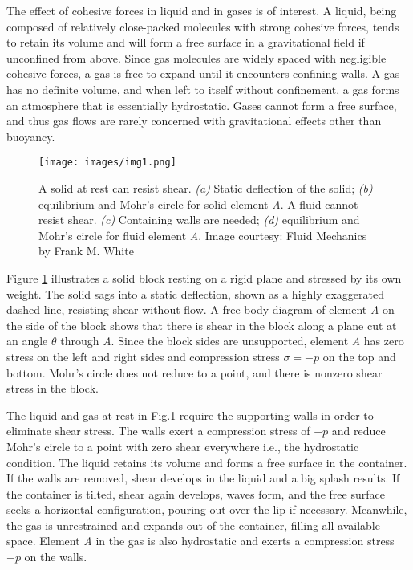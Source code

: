 \documentclass[12pt,twoside]{report}
\begin{document}
The effect of cohesive forces in liquid and in gases is of interest. A liquid, being composed of relatively close-packed molecules with strong cohesive forces, tends to retain its volume and will form a free surface in a gravitational field if unconfined from above. Since gas molecules are widely spaced with negligible cohesive forces, a gas is free to expand until it encounters confining walls. A gas has no definite volume, and when left to itself without confinement, a gas forms an atmosphere that is essentially hydrostatic. Gases cannot form a free surface, and thus gas flows are rarely concerned with gravitational effects other than buoyancy.\par
	
\begin{figure}[h]
	\centering
	\texttt{[image: images/img1.png]}
	\caption{A solid at rest can resist shear. \textit{(a)} Static deflection of the
			solid; \textit{(b)} equilibrium and Mohr’s circle for solid element \textit{A}. A fluid cannot resist shear. \textit{(c)} Containing walls are needed; \textit{(d)} equilibrium and Mohr’s circle for fluid element \textit{A}. Image courtesy: Fluid Mechanics by Frank M. White}
	\label{img1}
\end{figure}

Figure \ref{img1} illustrates a solid block resting on a rigid plane and stressed by its own weight. The solid sags into a static deflection, shown as a highly exaggerated dashed line, resisting shear without flow. A free-body diagram of element \textit{A} on the side of the block shows that there is shear in the block along a plane cut at an angle $\theta$ through \textit{A}. Since the block sides are unsupported, element \textit{A} has zero stress on the left and right sides and compression stress $\sigma = -p$ on the top and bottom. Mohr’s circle does not reduce to a point, and there is nonzero shear stress in the block.\par
	
The liquid and gas at rest in Fig.\ref{img1} require the supporting walls in order to eliminate shear stress. The walls exert a compression stress of $-p$ and reduce Mohr’s circle to a point with zero shear everywhere i.e., the hydrostatic condition. The liquid retains its volume and forms a free surface in the container. If the walls are removed, shear develops in the liquid and a big splash results. If the container is tilted, shear again develops, waves form, and the free surface seeks a horizontal configuration, pouring out over the lip if necessary. Meanwhile, the gas is unrestrained and expands out of the container, filling all available space. Element \textit{A} in the gas is also hydrostatic and exerts a compression stress $-p$ on the walls. \cite{White} 
\end{document}
